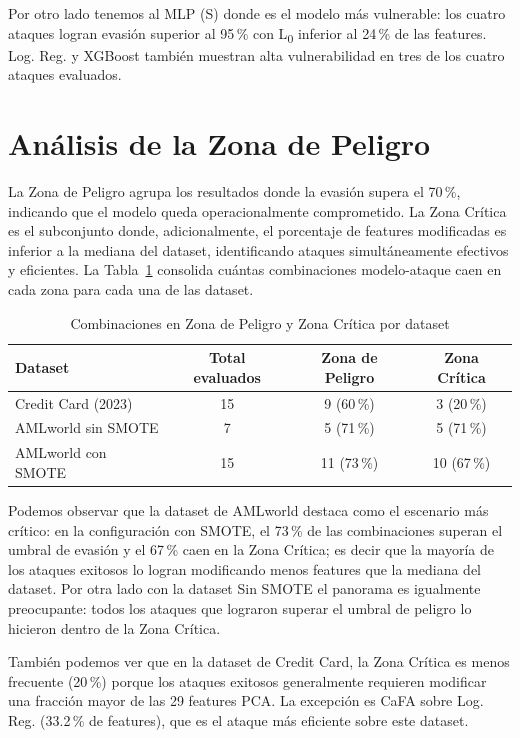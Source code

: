 Por otro lado tenemos al MLP (S) donde es el modelo más vulnerable: los cuatro ataques logran evasión superior al 95\,\% con L\textsubscript{0} inferior al 24\,\% de las features. Log. Reg. y XGBoost también muestran alta vulnerabilidad en tres de los cuatro ataques evaluados.

% 
\section{Análisis de la Zona de Peligro}
% 

La Zona de Peligro agrupa los resultados donde la evasión supera el 70\,\%, indicando que el modelo queda operacionalmente comprometido. La Zona Crítica es el subconjunto donde, adicionalmente, el porcentaje de features modificadas es inferior a la mediana del dataset, identificando ataques simultáneamente efectivos y eficientes. La Tabla~\ref{tab:zona_peligro} consolida cuántas combinaciones modelo-ataque caen en cada zona para cada una de las dataset.

\begin{table}[H]
\centering
\caption{Combinaciones en Zona de Peligro y Zona Crítica por dataset}
\label{tab:zona_peligro}
\begin{tabular}{lccc}
\hline
\textbf{Dataset} & \textbf{Total evaluados} & \textbf{Zona de Peligro} & \textbf{Zona Crítica} \\
\hline
Credit Card (2023)        & 15 &  9 (60\,\%) &  3 (20\,\%) \\
AMLworld sin SMOTE       &  7 &  5 (71\,\%) &  5 (71\,\%) \\
AMLworld con SMOTE       & 15 & 11 (73\,\%) & 10 (67\,\%) \\
\hline
\end{tabular}
\end{table}

Podemos observar que la dataset de AMLworld destaca como el escenario más crítico: en la configuración con SMOTE, el 73\,\% de las combinaciones superan el umbral de evasión y el 67\,\% caen en la Zona Crítica; es decir que la mayoría de los ataques exitosos lo logran modificando menos features que la mediana del dataset. Por otra lado con la dataset Sin SMOTE el panorama es igualmente preocupante: todos los ataques que lograron superar el umbral de peligro lo hicieron dentro de la Zona Crítica.

También podemos ver que en la dataset de Credit Card, la Zona Crítica es menos frecuente (20\,\%) porque los ataques exitosos generalmente requieren modificar una fracción mayor de las 29 features PCA. La excepción es CaFA sobre Log. Reg. (33.2\,\% de features), que es el ataque más eficiente sobre este dataset.



